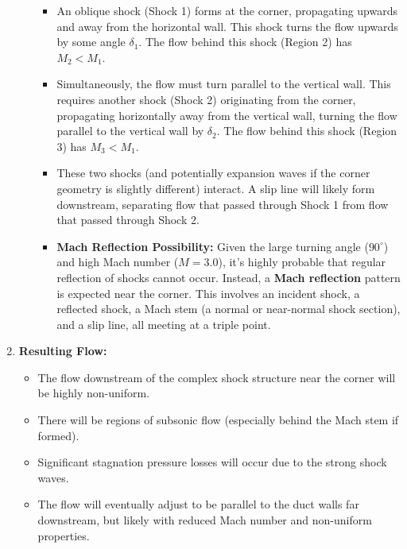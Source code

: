 \begin{enumerate}
\begin{itemize}
    \begin{itemize}
    \tightlist
    \item
      An oblique shock (Shock 1) forms at the corner, propagating
      upwards and away from the horizontal wall. This shock turns the
      flow upwards by some angle \(\delta_1\). The flow behind this
      shock (Region 2) has \(M_2 < M_1\).
    \item
      Simultaneously, the flow must turn parallel to the vertical wall.
      This requires another shock (Shock 2) originating from the corner,
      propagating horizontally away from the vertical wall, turning the
      flow parallel to the vertical wall by \(\delta_2\). The flow
      behind this shock (Region 3) has \(M_3 < M_1\).
    \item
      These two shocks (and potentially expansion waves if the corner
      geometry is slightly different) interact. A slip line will likely
      form downstream, separating flow that passed through Shock 1 from
      flow that passed through Shock 2.
    \item
      \textbf{Mach Reflection Possibility:} Given the large turning
      angle (\(90^\circ\)) and high Mach number (\(M=3.0\)), it's highly
      probable that regular reflection of shocks cannot occur. Instead,
      a \textbf{Mach reflection} pattern is expected near the corner.
      This involves an incident shock, a reflected shock, a Mach stem (a
      normal or near-normal shock section), and a slip line, all meeting
      at a triple point.
    \end{itemize}
  \end{itemize}
\item
  \textbf{Resulting Flow:}

  \begin{itemize}
  \tightlist
  \item
    The flow downstream of the complex shock structure near the corner
    will be highly non-uniform.
  \item
    There will be regions of subsonic flow (especially behind the Mach
    stem if formed).
  \item
    Significant stagnation pressure losses will occur due to the strong
    shock waves.
  \item
    The flow will eventually adjust to be parallel to the duct walls far
    downstream, but likely with reduced Mach number and non-uniform
    properties.
  \end{itemize}
\end{enumerate}

